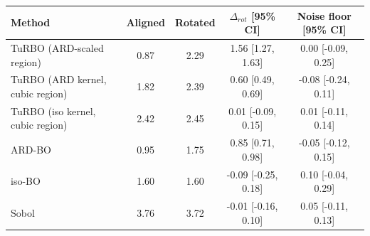 \begin{tabular}{lcccc}
\toprule
Method & Aligned & Rotated & $\Delta_{rot}$ [95\% CI] & Noise floor [95\% CI] \\
\midrule
TuRBO (ARD-scaled region) & 0.87 & 2.29 & 1.56 [1.27, 1.63] & 0.00 [-0.09, 0.25] \\
TuRBO (ARD kernel, cubic region) & 1.82 & 2.39 & 0.60 [0.49, 0.69] & -0.08 [-0.24, 0.11] \\
TuRBO (iso kernel, cubic region) & 2.42 & 2.45 & 0.01 [-0.09, 0.15] & 0.01 [-0.11, 0.14] \\
ARD-BO & 0.95 & 1.75 & 0.85 [0.71, 0.98] & -0.05 [-0.12, 0.15] \\
iso-BO & 1.60 & 1.60 & -0.09 [-0.25, 0.18] & 0.10 [-0.04, 0.29] \\
Sobol & 3.76 & 3.72 & -0.01 [-0.16, 0.10] & 0.05 [-0.11, 0.13] \\
\bottomrule
\end{tabular}
